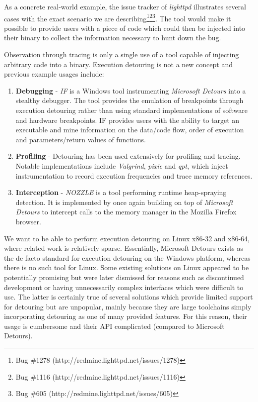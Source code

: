 As a concrete real-world example, the issue tracker of \emph{lighttpd} illustrates several cases with the exact scenario we are describing\footnote{Bug \#1278 (http://redmine.lighttpd.net/issues/1278)}\footnote{Bug \#1116 (http://redmine.lighttpd.net/issues/1116)}\footnote{Bug \#605 (http://redmine.lighttpd.net/issues/605)}. The tool would make it possible to provide users with a piece of code which could then be injected into their binary to collect the information necessary to hunt down the bug.

Observation through tracing is only a single use of a tool capable of injecting arbitrary code into a binary. Execution detouring is not a new concept and previous example usages include:

\begin{enumerate}
 \item \textbf{Debugging} - \emph{IF} is a Windows tool instrumenting \emph{Microsoft Detours} into a stealthy debugger. The tool provides the emulation of breakpoints through execution detouring rather than using standard implementations of software and hardware breakpoints\cite{IF}. IF provides users with the ability to target an executable and mine information on the data/code flow, order of execution and parameters/return values of functions. 
 \item \textbf{Profiling} - Detouring has been used extensively for profiling and tracing. Notable implementations include \emph{Valgrind}, \emph{pixie} and \emph{qpt}\cite{qpt,qpt_pixie,valgrind}, which inject instrumentation to record execution frequencies and trace memory references.
 \item \textbf{Interception} - \emph{NOZZLE} is a tool performing runtime heap-spraying detection\cite{nozzle}. It is implemented by once again building on top of \emph{Microsoft Detours} to intercept calls to the memory manager in the Mozilla Firefox browser.
\end{enumerate}

We want to be able to perform execution detouring on Linux x86-32 and x86-64, where related work is relatively sparse. Essentially, Microsoft Detours exists as the de facto standard for execution detouring on the Windows platform, whereas there is no such tool for Linux. Some existing solutions on Linux appeared to be potentially promising but were later dismissed for reasons such as discontinued development or having unnecessarily complex interfaces which were difficult to use. The latter is certainly true of several solutions which provide limited support for detouring but are unpopular, mainly because they are large toolchains simply incorporating detouring as one of many provided features. For this reason, their usage is cumbersome and their API complicated (compared to Microsoft Detours).

